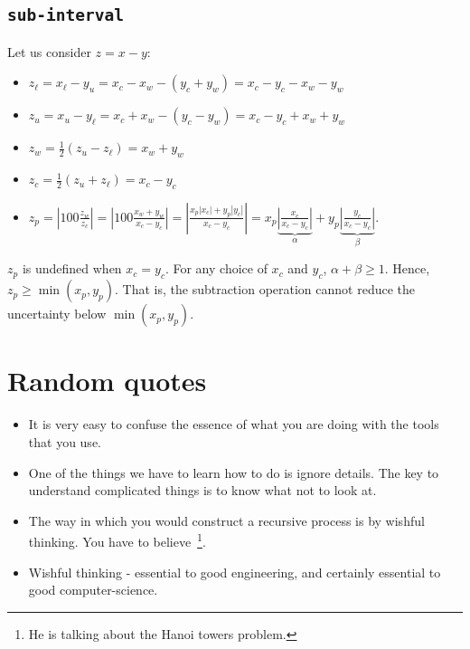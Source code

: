 \documentclass[12pt,a4paper]{article}
\newcommand\cc[1]{\texttt{#1}}
\newcommand{\abs}[1]{\left|#1\right|}
\begin{document}
\subsection{\cc{sub-interval}}

Let us consider $z = x - y$:
\begin{itemize}
\item $z_{\ell} = x_{\ell} - y_{u} = x_c - x_w - (y_c + y_w) = x_c - y_c - x_w - y_w$
\item $z_{u} = x_{u} - y_{\ell} = x_c + x_w - (y_c - y_w) = x_c - y_c + x_w + y_w$
\item $z_w = \frac{1}{2}(z_u - z_{\ell}) = x_w + y_w$
\item $z_c = \frac{1}{2}(z_u + z_{\ell}) = x_c - y_c$
\item $z_p = \abs{100\frac{z_w}{z_c}} = \abs{100\frac{x_w + y_w}{x_c - y_c}} = \abs{\frac{x_p\abs{x_c} + y_p\abs{y_c}}{x_c - y_c}} = x_p\underbrace{\abs{\frac{x_c}{x_c - y_c}}}_{\alpha} + y_p\underbrace{\abs{\frac{y_c}{x_c - y_c}}}_{\beta}$.
\end{itemize}
$z_p$ is undefined when $x_c = y_c$. For any choice of $x_c$ and $y_c$, $\alpha + \beta
\geq 1$. Hence, $z_p \geq \min(x_p, y_p)$. That is, the subtraction operation cannot
reduce the uncertainty below $\min(x_p, y_p)$.

\appendix
\appendixpage

\section{Random quotes}

\begin{itemize}
\item It is very easy to confuse the essence of what you are doing with the tools that
  you use.
\item One of the things we have to learn how to do is ignore details. The key to
  understand complicated things is to know what not to look at.
\item The way in which you would construct a recursive process is by wishful thinking.
  You have to believe~\footnote{He is talking about the Hanoi towers problem.}.
\item Wishful thinking - essential to good engineering, and certainly essential to good
  computer-science.
\end{itemize}

\nocite{*}


\end{document}
